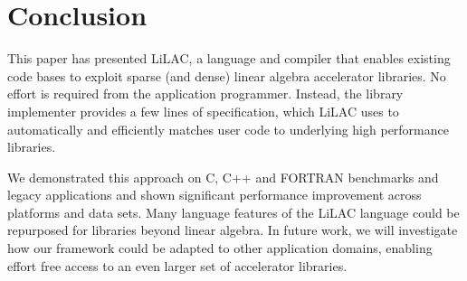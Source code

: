 \section{Conclusion}
\label{sec:conclusion}



This paper has presented LiLAC, a language and compiler that enables existing
code bases to exploit sparse (and dense) linear algebra accelerator libraries.
No effort is required from the application programmer.
Instead, the library implementer provides a few lines of specification, which
LiLAC uses to  automatically and efficiently matches  user code to
underlying high performance libraries.

We demonstrated this approach on  C, C++ and FORTRAN benchmarks and
legacy applications and shown significant performance improvement across
platforms and data sets.
Many language features of the LiLAC language could be repurposed for libraries
beyond linear algebra.
In future work, we will investigate how our framework could be adapted to other
application domains, enabling effort free access to an even larger set of
accelerator libraries.

